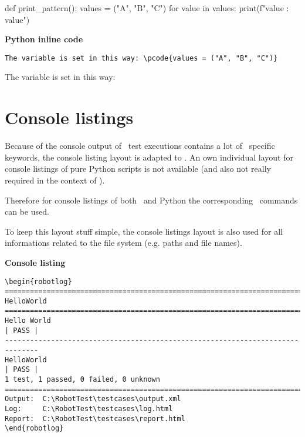 \documentclass[a4paper,10pt]{report}
\begin{document}
\begin{pythoncode}[caption=Python code example, 
                   linebackgroundcolor=\hlcode{1,3}]
def print_pattern():
    values = ("A", "B", "C")
    for value in values:
        print(f"value : {value}")
\end{pythoncode}

\vspace{2ex}

\textbf{Python inline code}
\begin{verbatim}
The variable is set in this way: \pcode{values = ("A", "B", "C")}
\end{verbatim}

The variable is set in this way: 

\newpage

\section{Console listings}

Because of the console output of \rfw\ test executions contains a lot of \rfw\ specific keywords, the console listing layout is adapted to \rfw.
An own individual layout for console listings of pure Python scripts is not available (and also not really required in the context of \rfw).

Therefore for console listings of both \rfw\ and Python the corresponding \rfw\ commands can be used.

To keep this layout stuff simple, the console listings layout is also used for all informations related to the file system (e.g. paths and file names).

\vspace{2ex}

\textbf{Console listing}

\begin{verbatim}
\begin{robotlog}
==============================================================================
HelloWorld
==============================================================================
Hello World                                                           | PASS |
------------------------------------------------------------------------------
HelloWorld                                                            | PASS |
1 test, 1 passed, 0 failed, 0 unknown
==============================================================================
Output:  C:\RobotTest\testcases\output.xml
Log:     C:\RobotTest\testcases\log.html
Report:  C:\RobotTest\testcases\report.html
\end{robotlog}
\end{verbatim}
\end{document}
